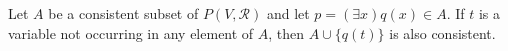 Let $A$ be a consistent subset of $P(V, \mathcal{R})$ and let $p = (\exists x)q(x) \in A$. If $t$ is a variable not occurring in any element of $A$, then $A \cup \{q(t)\}$ is also consistent.
